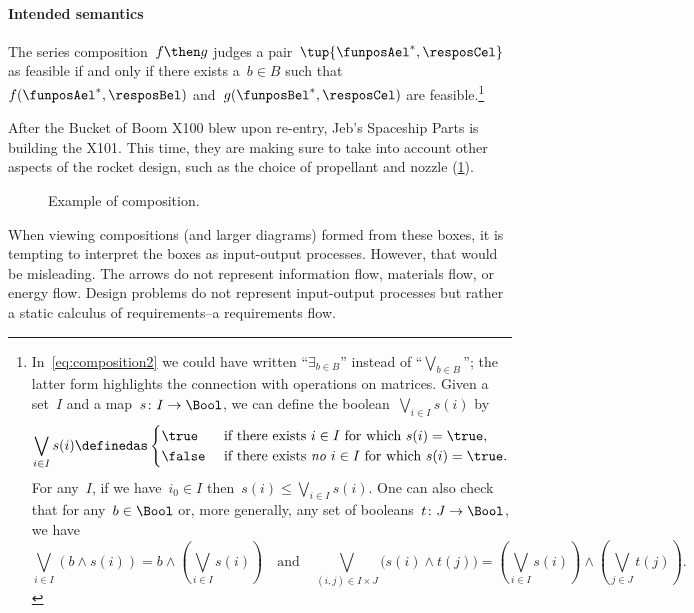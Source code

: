\paragraph{Intended semantics}
The series composition~$f\then g$ judges a pair~$\tup{\funposAel^*,\resposCel}$ as feasible if and only if there exists a~$b \in B$ such that~$f(\funposAel^*,\resposBel)$ and~$g(\funposBel^*,\resposCel)$ are feasible.\footnote{In~\cref{eq:composition2} we could have written ``$\exists_{b\in B}$'' instead of ``$\bigvee_{b\in B}$''; the latter form highlights the connection with operations on matrices. Given a set~$I$ and a map~$s\colon I\to\Bool$, we can define the boolean~$\bigvee_{i\in I}s(i)$ by
  \begin{equation*}
    \bigvee_{i\in I}s(i)\definedas
    \begin{cases}
      \true&\text{ if there exists }i\in I\text{ for which }s(i)=\true,\\
      \false&\text{ if there exists \emph{no} }i\in I\text{ for which }s(i)=\true.
    \end{cases}
  \end{equation*}
  For any~$I$, if we have~$i_0\in I$ then~$s(i)\leq\bigvee_{i\in I}s(i)$. One can also check that for any~$b\in\Bool$ or, more generally, any set of booleans~$t\colon J\to\Bool$, we have
  \begin{equation*}
    \bigvee_{i\in I}(b\wedge s(i))=b\wedge\left(\bigvee_{i\in I}s(i)\right)
    \quad\text{and}\quad
    \bigvee_{(i,j)\in I\times  J}\big(s(i)\wedge t(j)\big)=\left(\bigvee_{i\in I}s(i)\right)\wedge\left(\bigvee_{j\in J} t(j)\right).
  \end{equation*}
}

\begin{example}
  After the Bucket of Boom X100 blew upon re-entry, Jeb's Spaceship Parts is building the X101. This time, they are making sure to take into account other aspects of the rocket design, such as the choice of propellant and nozzle (\cref{fig:examplecomposition}).
  \begin{figure}[h!]
    \begin{center}
    \end{center}
    \caption{Example of composition. \label{fig:examplecomposition}}
  \end{figure}
\end{example}

\begin{remark}
  When viewing compositions (and larger diagrams) formed from these boxes, it is tempting to interpret the boxes as input-output processes. However, that would be misleading. The arrows do not represent information flow, materials flow, or energy flow. Design problems do not represent input-output processes but rather a static calculus of requirements--a requirements flow.
\end{remark}

